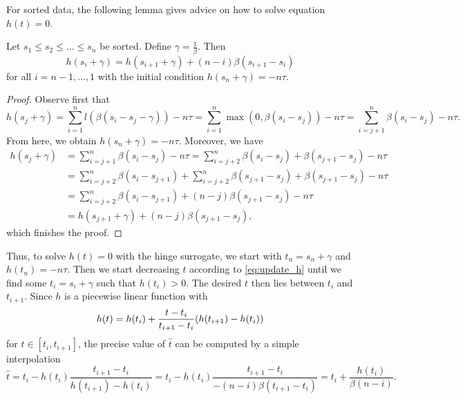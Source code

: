 For sorted data, the following lemma gives advice on how to solve equation $h(t)=0$. 

\begin{lemma}
  Let $s_1\le s_2 \le \dots \le s_n$ be sorted. Define $\gamma= \frac{1}{\beta}$. Then 
  \begin{equation}\label{eq:update_h}
    h(s_i+\gamma) = h(s_{i+1}+\gamma) + (n-i)\beta(s_{i+1}-s_i)
  \end{equation}
  for all $i=n-1,\dots,1$ with the initial condition $h(s_n+\gamma)=-n\tau$.
\end{lemma}
\begin{proof}
Observe first that
\begin{equation*}
  h(s_j+\gamma)
  = \sum_{i=1}^n l(\beta(s_i-s_j-\gamma)) - n\tau
  = \sum_{i=1}^n\max(0,\beta(s_i-s_j)) - n\tau
  = \sum_{i=j+1}^n \beta(s_i-s_j) - n\tau.
\end{equation*}
From here, we obtain $h(s_n+\gamma)=-n\tau$. Moreover, we have
\begin{equation*}
  \begin{aligned}
    h(s_j+\gamma)
    & = \sum_{i=j+1}^n \beta(s_i - s_j) - n\tau
      = \sum_{i=j+2}^n \beta(s_i - s_{j}) + \beta(s_{j+1}-s_{j})- n\tau \\
    & = \sum_{i=j+2}^n \beta(s_i - s_{j+1}) + \sum_{i=j+2}^n\beta(s_{j+1}-s_j) + \beta(s_{j+1}-s_{j})- n\tau \\
    & = \sum_{i=j+2}^n \beta(s_i-s_{j+1}) + (n-j)\beta(s_{j+1}-s_j)- n\tau \\
    & = h(s_{j+1}+\gamma) + (n-j)\beta(s_{j+1}-s_j),
  \end{aligned}
\end{equation*}
which finishes the proof.
\end{proof}

Thus, to solve $h(t)=0$ with the hinge surrogate, we start with $t_n=s_n+\gamma$ and $h(t_n)=-n\tau$. Then we start decreasing $t$ according to \eqref{eq:update_h} until we find some $t_i=s_i+\gamma$ such that $h(t_i)>0$. The desired $t$ then lies between $t_i$ and $t_{i+1}$. Since $h$ is a piecewise linear function with
\begin{equation*}
  h(t) = h(t_i) + \frac{t-t_i}{t_{i+1}-t_i}\Brac{h(t_{i+1})-h(t_i)}
\end{equation*}
for $t\in [t_i,t_{i+1}]$, the precise value of $\hat{t}$ can be computed by a simple interpolation
\begin{equation*}
  \hat{t}
  = t_i - h(t_i)\frac{t_{i+1}-t_i}{h(t_{i+1})-h(t_i)}
  = t_i - h(t_i)\frac{t_{i+1}-t_i}{-(n-i)\beta(t_{i+1}-t_{i})}
  = t_i + \frac{h(t_i)}{\beta(n-i)}.
\end{equation*}

